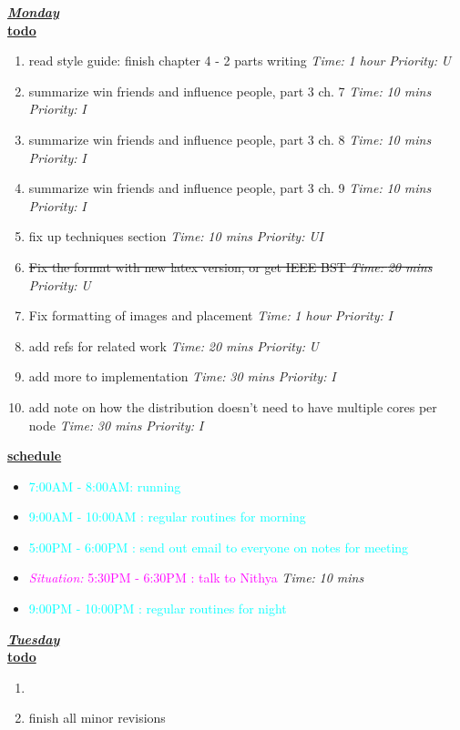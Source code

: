 \documentclass[11pt]{article}
\newcommand{\doneTask}[1]{\item \sout{#1}}
\newcommand{\timeEst}[1]{\textit{Time:} \textit{#1}}
\newcommand{\priority}[1]{\textit{Priority:} \textit{#1}}
\newcommand{\regItem}[1]{\item \textcolor{cyan}{#1}}
\newcommand{\situationItem}[1]{\item \textcolor{magenta}{\textit{Situation:} #1}}
\begin{document}
\underline{\textbf{\textit{Monday}}}\\
\underline{\textbf{todo}}\\
\begin{enumerate}
\item read style guide:  finish chapter 4 - 2 parts writing \timeEst{1 hour} \priority{U}
\item summarize win friends and influence people, part 3 ch. 7 \timeEst{10 mins} \priority{I}
\item summarize win friends and influence people, part 3 ch. 8 \timeEst{10 mins} \priority{I}
\item summarize win friends and influence people, part 3 ch. 9 \timeEst{10 mins} \priority{I}
\item fix up techniques section \timeEst{10 mins}  \priority{UI}
\doneTask{Fix the format with new latex version, or get IEEE BST \timeEst{20 mins}}  \priority{U}
\item Fix formatting of images and placement \timeEst{1 hour} \priority{I}
\item add refs for related work \timeEst{20 mins} \priority{U}
\item add more to implementation \timeEst{30 mins} \priority{I}
\item add note on how the distribution doesn't need to have multiple cores per node \timeEst{30 mins} \priority{I}
\end{enumerate}

\underline{\textbf{schedule}}\\
\begin{itemize}
\regItem{7:00AM - 8:00AM: running}
\regItem{9:00AM - 10:00AM : regular routines for morning}
\regItem{5:00PM - 6:00PM : send out email to everyone on notes for meeting}
\situationItem{ 5:30PM - 6:30PM : talk to Nithya} \timeEst{10 mins}
\regItem{9:00PM - 10:00PM : regular routines for night}
\end{itemize}

\underline{\textbf{\textit{Tuesday}}}\\
\underline{\textbf{todo}}\\
\begin{enumerate}
\item
\item finish all minor revisions

\end{enumerate}
\end{document}
